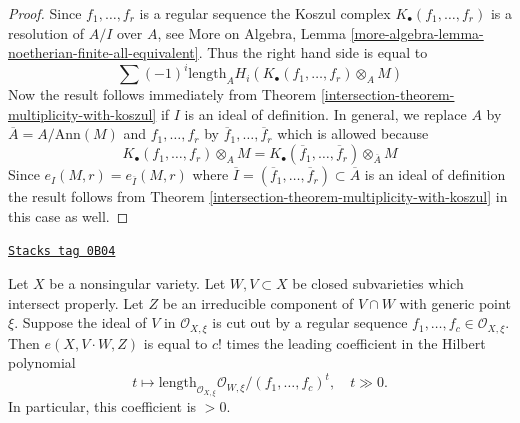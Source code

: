 \begin{proof}

Since $f_1, \ldots, f_r$ is a regular sequence the Koszul complex
$K_\bullet(f_1, \ldots, f_r)$ is a resolution of $A/I$ over $A$, see
More on Algebra, Lemma
\ref{more-algebra-lemma-noetherian-finite-all-equivalent}.
Thus the right hand side is equal to
$$
\sum (-1)^i\text{length}_A H_i(K_\bullet(f_1, \ldots, f_r) \otimes_A M)
$$
Now the result follows immediately from
Theorem \ref{intersection-theorem-multiplicity-with-koszul} if $I$ is an ideal
of definition. In general, we replace $A$ by $\overline{A} = A/\text{Ann}(M)$
and $f_1, \ldots, f_r$ by $\overline{f}_1, \ldots, \overline{f}_r$
which is allowed because
$$
K_\bullet(f_1, \ldots, f_r) \otimes_A M =
K_\bullet(\overline{f}_1, \ldots, \overline{f}_r) \otimes_{\overline{A}} M
$$
Since $e_I(M, r) = e_{\overline{I}}(M, r)$ where
$\overline{I} = (\overline{f}_1, \ldots, \overline{f}_r) \subset \overline{A}$
is an ideal of definition the result follows from
Theorem \ref{intersection-theorem-multiplicity-with-koszul} in this case as well.
\end{proof}

\begin{lemma}
\label{intersection-lemma-multiplicity-with-lci}
\href{https://stacks.math.columbia.edu/tag/0B04}{\texttt{Stacks tag 0B04}}

Let $X$ be a nonsingular variety. Let $W,V \subset X$ be
closed subvarieties which intersect properly. Let $Z$ be an irreducible
component of $V \cap W$ with generic point $\xi$.
Suppose the ideal of $V$ in $\mathcal{O}_{X, \xi}$ is cut out by
a regular sequence $f_1, \ldots, f_c \in \mathcal{O}_{X, \xi}$.
Then $e(X, V\cdot W, Z)$ is equal to $c!$ times the leading coefficient in
the Hilbert polynomial
$$
t \mapsto \text{length}_{\mathcal{O}_{X, \xi}}
\mathcal{O}_{W, \xi}/(f_1, \ldots, f_c)^t,\quad t \gg 0.
$$
In particular, this coefficient is $> 0$.
\end{lemma}

